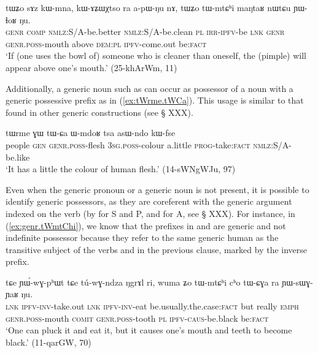 \begin{exe}
\ex  \label{ex:tWZo.tWmtChi}
\gll tɯʑo sɤz kɯ-mna, kɯ-ɤʑɯχtso ra a-pɯ-ŋu nɤ,  tɯʑo tɯ-mtɕʰi maŋtaʁ nɯtɕu ɲɯ-ɬoʁ ŋu. \\
\textsc{genr} \textsc{comp} \textsc{nmlz}:S/A-be.better \textsc{nmlz}:S/A-be.clean \textsc{pl} \textsc{irr}-\textsc{ipfv}-be \textsc{lnk}  \textsc{genr} \textsc{genr.poss}-mouth above \textsc{dem:pl} \textsc{ipfv}-come.out be:\textsc{fact} \\
\glt `If (one uses the bowl of) someone who is cleaner than oneself, the (pimple) will appear above one's mouth.' (25-khArWm, 11)
\end{exe}

Additionally, a generic noun such as  can occur as possessor of a noun with a generic possessive prefix as in (\ref{ex:tWrme.tWCa}). This usage is similar to that found in other generic constructions (see § XXX).

\begin{exe}
\ex  \label{ex:tWrme.tWCa}
\gll tɯrme ɣɯ tɯ-ɕa ɯ-mdoʁ tsa asɯ-ndo kɯ-fse \\
people \textsc{gen} \textsc{genr.poss}-flesh \textsc{3sg.poss}-colour a.little \textsc{prog}-take:\textsc{fact} \textsc{nmlz}:S/A-be.like \\
\glt `It has a little the colour of human flesh.' (14-sWNgWJu, 97)
\end{exe}

Even when the generic pronoun or a generic noun is not present, it is possible to identify generic possessors, as they are coreferent with the generic argument indexed on the verb (by  for S and P, and  for A, see § XXX). For instance, in (\ref{ex:genr.tWmtChi}), we know that  the  prefixes in  and   are generic and not indefinite possessor because they refer to the same generic human as the transitive subject of the verbs  and  in the previous clause, marked by the inverse prefix.

\begin{exe}
\ex  \label{ex:genr.tWmtChi}
\gll
tɕe ɲɯ́-wɣ-pʰɯt tɕe tú-wɣ-ndza ŋgrɤl ri, wuma ʑo tɯ-mtɕʰi cʰo tɯ-ɕɣa ra ɲɯ-sɯɣ-ɲaʁ ŋu. \\
\textsc{lnk} \textsc{ipfv}-\textsc{inv}-take.out \textsc{lnk} \textsc{ipfv}-\textsc{inv}-eat be.usually.the.case:\textsc{fact} but really \textsc{emph}  \textsc{genr.poss}-mouth \textsc{comit} \textsc{genr.poss}-tooth \textsc{pl}  \textsc{ipfv}-\textsc{caus}-be.black be:\textsc{fact} \\
\glt `One can pluck it and eat it, but it causes one's mouth and teeth to become black.' (11-qarGW, 70) 
\end{exe}

